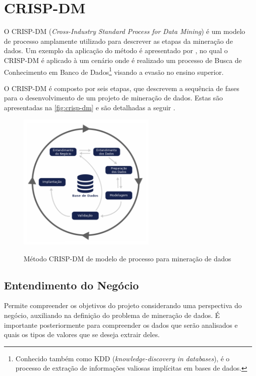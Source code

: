 \section{CRISP-DM}
\label{ssec:crisp}
 
O CRISP-DM (\textit{Cross-Industry Standard Process for Data Mining}) é um modelo de processo amplamente utilizado para descrever as etapas da mineração de dados. Um exemplo da aplicação do método é apresentado por , no qual o CRISP-DM é aplicado à um cenário onde é realizado um processo de Busca de Conhecimento em Banco de Dados\footnote{Conhecido também como KDD (\textit{knowledge-discovery in databases}), é o processo de extração de informações valiosas implícitas em bases de dados.} visando a evasão no ensino superior.

O CRISP-DM é composto por seis etapas, que descrevem a sequência de fases para o desenvolvimento de um projeto de mineração de dados. Estas são apresentadas na \autoref{fig:crisp-dm} e são detalhadas a seguir \cite{Chapman2000, Shearer2000}.

\begin{figure}[!htb]
    \centering
    \caption{Método CRISP-DM de modelo de processo para mineração de dados}
    \includegraphics[width=0.6\textwidth]{./dados/figuras/proposta/crisp-dm}
    \label{fig:crisp-dm}
\end{figure}

\subsection{Entendimento do Negócio}

Permite compreender os objetivos do projeto considerando uma perspectiva do negócio, auxiliando na definição do problema de mineração de dados. 
É importante posteriormente para compreender os dados que serão analisados e quais os tipos de valores que se deseja extrair deles.

